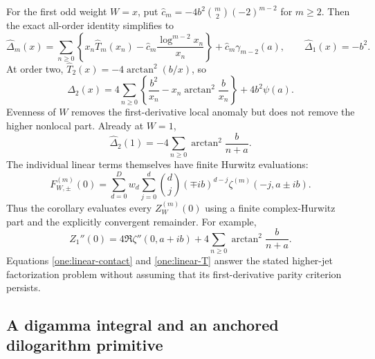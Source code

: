 \documentclass[11pt,a4paper]{article}
\numberwithin{equation}{section}
\theoremstyle{plain}
\theoremstyle{definition}
\theoremstyle{remark}
\begin{document}
For the first odd weight $W=x$, put
$\widehat c_m=-4b^2\binom m2(-2)^{m-2}$ for $m\ge2$.
Then the exact all-order identity simplifies to
\begin{equation}\label{one:linear-isolate}
 \widehat\Delta_m(x)=\sum_{n\ge0}\left\{
 x_n\widehat T_m(x_n)-\widehat c_m
                         \frac{\log^{m-2}x_n}{x_n}\right\}
                         +\widehat c_m\gamma_{m-2}(a),
 \qquad \widehat\Delta_1(x)=-b^2.
\end{equation}
At order two, $\widehat T_2(x)=-4\arctan^2(b/x)$, so
\begin{equation}\label{one:linear-second}
 \boxed{\displaystyle
 \widehat\Delta_2(x)=
 4\sum_{n\ge0}\left\{\frac{b^2}{x_n}
                       -x_n\arctan^2\frac b{x_n}\right\}
                                      +4b^2\psi(a).}
\end{equation}
Evenness of $W$ removes the first-derivative local anomaly but does
not remove the higher nonlocal part.  Already at $W=1$,
\[
 \widehat\Delta_2(1)=-4\sum_{n\ge0}\arctan^2\frac b{n+a}.
\]
The individual linear terms themselves have finite Hurwitz evaluations:
\begin{equation}\label{one:linear-hurwitz}
 F_{W,\pm}^{(m)}(0)=
 \sum_{d=0}^D w_d\sum_{j=0}^d\binom dj
       (\mp ib)^{d-j}\zeta^{(m)}(-j,a\pm ib).
\end{equation}
Thus the corollary evaluates every $Z_W^{(m)}(0)$ using a finite
complex-Hurwitz part and the explicitly convergent remainder.
For example,
\begin{equation}\label{one:linear-unweighted}
 Z_1''(0)=4\Re\zeta''(0,a+ib)
                     +4\sum_{n\ge0}\arctan^2\frac b{n+a}.
\end{equation}
Equations \eqref{one:linear-contact} and \eqref{one:linear-T}
answer the stated higher-jet factorization problem without assuming that
its first-derivative parity criterion persists.

\subsection{A digamma integral and an anchored dilogarithm primitive}
\end{document}
